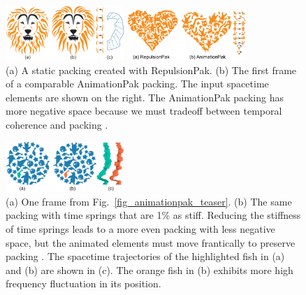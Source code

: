 \begin{figure}
\centering
\begin{minipage}{.47\textwidth}
  \centering
  \includegraphics[width=0.4\textwidth]{figures/animationpak/lion_comparison.pdf}
  \caption[A packing of lion's mane]
  {
  \label{fig_animationpak_lion}
    (a) A static packing made by an artist, taken from StockUnlimited. 
	(b) The first frame from an AnimationPak packing. 
	(c) The input animated elements and the container shape with a vector field.
	Torsional forces keep elements oriented in the direction of the
	vector field.  We simulate half of the lion's mane and render the other
	half using a reflection, and add the facial features by hand.
  }  
\end{minipage}%
\hspace{0.4cm}
\begin{minipage}{.47\textwidth}
  \centering
  \includegraphics[width=0.4\textwidth]{figures/animationpak/repulsionpak_vs_animationpak.pdf}
  \caption[A comparison between RepulsionPak and AnimationPak]
  {
  \label{fig_animationpak_repulsionpak_vs_animationpak}
  	(a) A static packing created with RepulsionPak.
	(b) The first frame of a comparable AnimationPak packing.
    The input spacetime elements are shown on the right.
	The AnimationPak packing has more negative space because
	we must tradeoff between temporal coherence and packing .
  }  
\end{minipage}
\end{figure}


\begin{figure}[t]
\centering
\includegraphics[width=0.4\textwidth]{figures/animationpak/teaser_weak_t_springs.pdf} 
\caption[The effect of adjusting time spring stiffness]
{\label{fig_animationpak_teaser_weak_t_springs} 
(a) One frame from Fig.~\ref{fig_animationpak_teaser}.
(b) The same packing with time springs that are 1\% as stiff.
Reducing the stiffness of time springs leads to a more even packing with
less negative space, but the animated elements must move frantically to
preserve packing .  
The spacetime trajectories of the highlighted
fish in (a) and (b) are shown in (c).  The orange fish in (b) exhibits more
high frequency fluctuation in its position.
}
\end{figure}

